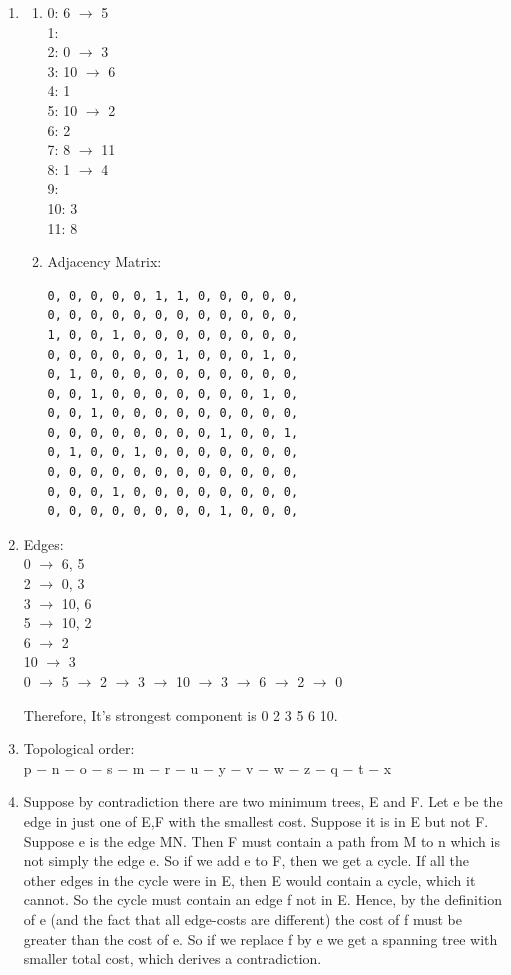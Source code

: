 \documentclass[11pt,fleqn]{article}
\begin{document}
\begin{enumerate}
	\item 
		\begin{enumerate}
			\item
0: 6 $\rightarrow$ 5 \\
1: \\
2: 0 $\rightarrow$ 3 \\
3: 10 $\rightarrow$ 6 \\
4: 1 \\
5: 10 $\rightarrow$ 2 \\
6: 2 \\
7: 8 $\rightarrow$ 11 \\
8: 1 $\rightarrow$ 4 \\
9: \\
10: 3 \\
11: 8
			\item Adjacency Matrix:
\begin{verbatim}
0, 0, 0, 0, 0, 1, 1, 0, 0, 0, 0, 0, 
0, 0, 0, 0, 0, 0, 0, 0, 0, 0, 0, 0, 
1, 0, 0, 1, 0, 0, 0, 0, 0, 0, 0, 0, 
0, 0, 0, 0, 0, 0, 1, 0, 0, 0, 1, 0, 
0, 1, 0, 0, 0, 0, 0, 0, 0, 0, 0, 0, 
0, 0, 1, 0, 0, 0, 0, 0, 0, 0, 1, 0, 
0, 0, 1, 0, 0, 0, 0, 0, 0, 0, 0, 0, 
0, 0, 0, 0, 0, 0, 0, 0, 1, 0, 0, 1, 
0, 1, 0, 0, 1, 0, 0, 0, 0, 0, 0, 0, 
0, 0, 0, 0, 0, 0, 0, 0, 0, 0, 0, 0, 
0, 0, 0, 1, 0, 0, 0, 0, 0, 0, 0, 0, 
0, 0, 0, 0, 0, 0, 0, 0, 1, 0, 0, 0, 
\end{verbatim}
		\end{enumerate}

	\item Edges: \\
0 $\rightarrow$ 6, 5 \\
2 $\rightarrow$ 0, 3 \\
3 $\rightarrow$ 10, 6 \\
5 $\rightarrow$ 10, 2 \\
6 $\rightarrow$ 2 \\
10 $\rightarrow$ 3 \\

0 $\rightarrow$ 5 $\rightarrow$ 2 $\rightarrow$ 3 $\rightarrow$ 10 $\rightarrow$ 3 $\rightarrow$ 6 $\rightarrow$ 2 $\rightarrow$ 0

Therefore, It's strongest component is 0 2 3 5 6 10.

	\item Topological order: \\
p $-$ n $-$ o $-$ s $-$ m $-$ r $-$ u $-$ y $-$ v $-$ w $-$ z $-$ q $-$ t $-$ x 

\newpage

	\item Suppose by contradiction there are two minimum trees, E and F. Let e be the edge in just one of E,F with the smallest cost. 
Suppose it is in E but not F. Suppose e is the edge MN. Then F must contain a path from M to n which is not simply the edge e. 
So if we add e to F, then we get a cycle. If all the other edges in the cycle were in E, then E would contain a cycle, which it cannot. 
So the cycle must contain an edge f not in E. Hence, by the definition of e (and the fact that all edge-costs are different) the cost of f must be greater than the cost of e. 
So if we replace f by e we get a spanning tree with smaller total cost, which derives a contradiction.


\end{enumerate}
\end{document}
